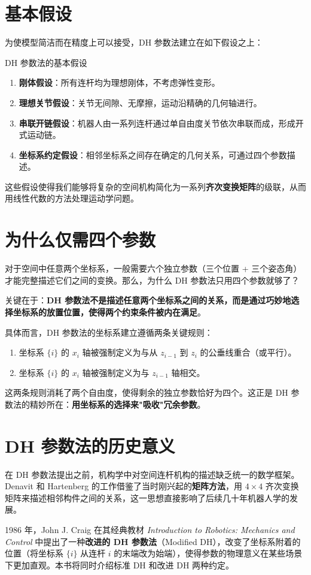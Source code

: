 \section{基本假设}

为使模型简洁而在精度上可以接受，DH 参数法建立在如下假设之上：

\begin{myhypothesis}{DH 参数法的基本假设}
	\begin{enumerate}
		\item \textbf{刚体假设}：所有连杆均为理想刚体，不考虑弹性变形。\\
		\item \textbf{理想关节假设}：关节无间隙、无摩擦，运动沿精确的几何轴进行。\\
		\item \textbf{串联开链假设}：机器人由一系列连杆通过单自由度关节依次串联而成，形成开式运动链。\\
		\item \textbf{坐标系约定假设}：相邻坐标系之间存在确定的几何关系，可通过四个参数描述。
	\end{enumerate}
\end{myhypothesis}

这些假设使得我们能够将复杂的空间机构简化为一系列\textbf{齐次变换矩阵}的级联，从而用线性代数的方法处理运动学问题。

\section{为什么仅需四个参数}

对于空间中任意两个坐标系，一般需要六个独立参数（三个位置 + 三个姿态角）才能完整描述它们之间的变换。那么，为什么 DH 参数法只用四个参数就够了？

关键在于：\textbf{DH 参数法不是描述任意两个坐标系之间的关系，而是通过巧妙地选择坐标系的放置位置，使得两个约束条件被内在满足}。

具体而言，DH 参数法的坐标系建立遵循两条关键规则：
\begin{enumerate}
	\item 坐标系 $\{i\}$ 的 $x_i$ 轴被强制定义为与从 $z_{i-1}$ 到 $z_i$ 的公垂线重合（或平行）。
	\item 坐标系 $\{i\}$ 的 $x_i$ 轴被强制定义为与 $z_{i-1}$ 轴相交。
\end{enumerate}

这两条规则消耗了两个自由度，使得剩余的独立参数恰好为四个。这正是 DH 参数法的精妙所在：\textbf{用坐标系的选择来"吸收"冗余参数}。

\section{DH 参数法的历史意义}

在 DH 参数法提出之前，机构学中对空间连杆机构的描述缺乏统一的数学框架。Denavit 和 Hartenberg 的工作借鉴了当时刚兴起的\textbf{矩阵方法}，用 $4 \times 4$ 齐次变换矩阵来描述相邻构件之间的关系，这一思想直接影响了后续几十年机器人学的发展。

1986 年，John J. Craig 在其经典教材 \textit{Introduction to Robotics: Mechanics and Control} 中提出了一种\textbf{改进的 DH 参数法}（Modified DH），改变了坐标系附着的位置（将坐标系 $\{i\}$ 从连杆 $i$ 的末端改为始端），使得参数的物理意义在某些场景下更加直观。本书将同时介绍标准 DH 和改进 DH 两种约定。
